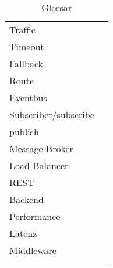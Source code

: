 \begin{longtable}[center]{lp{10cm}}
				Traffic & \\
				Timeout & \\
				Fallback & \\
				Route & \\
				Eventbus & \\
				Subscriber/subscribe & \\
				publish & \\
				Message Broker & \\
				Load Balancer & \\
				REST & \\
				Backend & \\
				Performance & \\
				Latenz & \\
				Middleware & \\
		\caption[Glossar]{Glossar}
	\end{longtable}